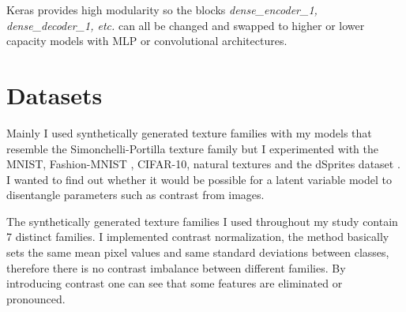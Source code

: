 \documentclass[12pt, english]{article}
\begin{document}
\vspace{4mm}

\par Keras provides high modularity so the blocks \textit{dense\_encoder\_1, dense\_decoder\_1, etc.} can all be
changed and swapped to higher or lower capacity models with MLP or convolutional architectures.

\newpage

\section{Datasets}

\vspace{7mm}

\par Mainly I used synthetically generated texture families with my models that resemble the Simonchelli-Portilla texture family \cite{portilla2003image} but I experimented with the MNIST, Fashion-MNIST \cite{xiao2017fashion}, CIFAR-10, natural textures and the dSprites dataset \cite{matthey2017dsprites}. I wanted to find out whether it would be possible for a latent variable model to disentangle parameters such as contrast from images.

\vspace{4mm}

\par The synthetically generated texture families I used throughout my study contain 7 distinct families. I implemented contrast normalization, the method basically sets the same mean pixel values and same standard deviations between classes, therefore there is no contrast imbalance between different families. By introducing contrast one can see that some features are eliminated or pronounced.

\vspace{4mm}
\end{document}
